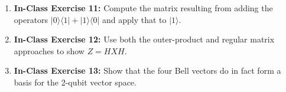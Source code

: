 \documentclass[main.tex]{subfiles}
\begin{document}
\begin{enumerate}
\item[] \textbf{In-Class Exercise 11:} Compute the matrix resulting from adding the operators $|0\rangle\langle 1|+| 1\rangle\langle 0|$ and apply that to $|1\rangle .$

\item[] \textbf{In-Class Exercise 12:} Use both the outer-product and regular matrix approaches to show $Z=H X H$.

\item[] \textbf{In-Class Exercise 13:}  Show that the four Bell vectors do in fact form a basis for the 2-qubit vector space.

\end{enumerate}
\end{document}
